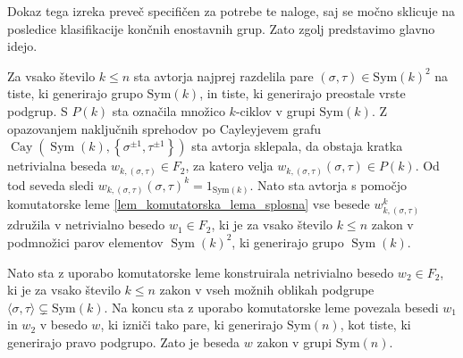 Dokaz tega izreka preveč specifičen za potrebe te naloge, saj se močno sklicuje na posledice klasifikacije končnih enostavnih grup. Zato zgolj predstavimo glavno idejo. 

Za vsako število $k \le n$ sta avtorja najprej razdelila pare $(\sigma, \tau) \in \text{Sym}(k)^2$ na tiste,
ki generirajo grupo $\text{Sym}(k)$, in tiste, ki generirajo preostale vrste podgrup. S $P(k)$ sta označila množico $k$-ciklov v grupi $\text{Sym}(k)$. Z opazovanjem naključnih sprehodov po Cayleyjevem grafu $\operatorname{Cay}(\operatorname{Sym}(k), \left\{ \sigma^{\pm 1}, \tau^{\pm 1} \right\} )$ sta avtorja sklepala, da obstaja kratka netrivialna beseda $w_{k, (\sigma, \tau)} \in F_2$, za katero velja
$w_{k, (\sigma, \tau)}(\sigma, \tau) \in P(k)$. Od tod seveda sledi $w_{k, (\sigma, \tau)}(\sigma, \tau)^k = 1_{\text{Sym}(k)}$. Nato sta avtorja s pomočjo komutatorske leme \ref{lem_komutatorska_lema_splosna} vse besede $w_{k, (\sigma, \tau)}^k$ združila v netrivialno besedo $w_1 \in F_2$, ki je za vsako število $k \le n$ zakon v podmnožici parov elementov $\operatorname{Sym}(k)^2$,
ki generirajo grupo $\operatorname{Sym}(k)$.

Nato sta z uporabo komutatorske leme konstruirala netrivialno besedo $w_2 \in F_2$, ki je za vsako število $k \le n$ zakon v vseh možnih oblikah podgrupe $\langle \sigma, \tau \rangle \subsetneq \text{Sym}(k)$.
Na koncu sta z uporabo komutatorske leme povezala besedi $w_1$ in $w_2$ v besedo $w$, ki izniči tako pare, ki generirajo $\text{Sym}(n)$, kot tiste, ki generirajo pravo podgrupo. Zato je beseda $w$ zakon v grupi $\text{Sym}(n)$.  

